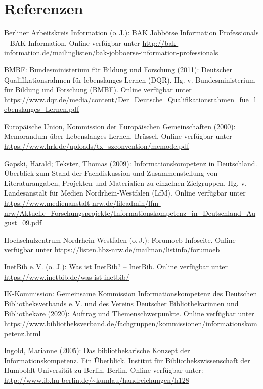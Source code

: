 \documentclass[a4paper,
fontsize=11pt,
oneside,
numbers=noperiodatend,
parskip=half-,
bibliography=totoc,
final
]{scrartcl}
\begin{document}
\hypertarget{referenzen}{%
\section{Referenzen}\label{referenzen}}

Berliner Arbeitskreis Information (o.\,J.): BAK Jobbörse Information
Professionals -- BAK Information. Online verfügbar unter
\url{http://bak-information.de/mailinglisten/bak-jobboerse-information-professionals}

BMBF: Bundesministerium für Bildung und Forschung (2011): Deutscher
Qualifikationsrahmen für lebenslanges Lernen (DQR). Hg. v.
Bundesministerium für Bildung und Forschung (BMBF). Online verfügbar
unter
\url{https://www.dqr.de/media/content/Der_Deutsche_Qualifikationsrahmen_fue_lebenslanges_Lernen.pdf}

Europäische Union, Kommission der Europäischen Gemeinschaften (2000):
Memorandum über Lebenslanges Lernen. Brüssel. Online verfügbar unter
\url{https://www.hrk.de/uploads/tx_szconvention/memode.pdf}

Gapski, Harald; Tekster, Thomas (2009): Informationskompetenz in
Deutschland. Überblick zum Stand der Fachdiskussion und Zusammenstellung
von Literaturangaben, Projekten und Materialien zu einzelnen
Zielgruppen. Hg. v. Landesanstalt für Medien Nordrhein-Westfalen (LfM).
Online verfügbar unter
\url{https://www.medienanstalt-nrw.de/fileadmin/lfm-nrw/Aktuelle_Forschungsprojekte/Informationskompetenz_in_Deutschland_August_09.pdf}

Hochschulzentrum Nordrhein-Westfalen (o.\,J.): Forumoeb Infoseite.
Online verfügbar unter\newline
\url{https://listen.hbz-nrw.de/mailman/listinfo/forumoeb}

InetBib e.\,V. (o.\,\,J.): Was ist InetBib? -- InetBib. Online verfügbar
unter \url{https://www.inetbib.de/was-ist-inetbib/}

IK-Kommission: Gemeinsame Kommission Informationskompetenz des Deutschen
Bibliotheksverbands e.\,V. und des Vereins Deutscher Bibliothekarinnen
und Bibliothekare (2020): Auftrag und Themenschwerpunkte. Online
verfügbar unter
\url{https://www.bibliotheksverband.de/fachgruppen/kommissionen/informationskompetenz.html}

Ingold, Marianne (2005): Das bibliothekarische Konzept der
Informationskompetenz. Ein Überblick. Institut für
Bibliothekswissenschaft der Humboldt-Universität zu Berlin, Berlin.
Online verfügbar unter:
\url{http://www.ib.hu-berlin.de/~kumlau/handreichungen/h128}
\end{document}
